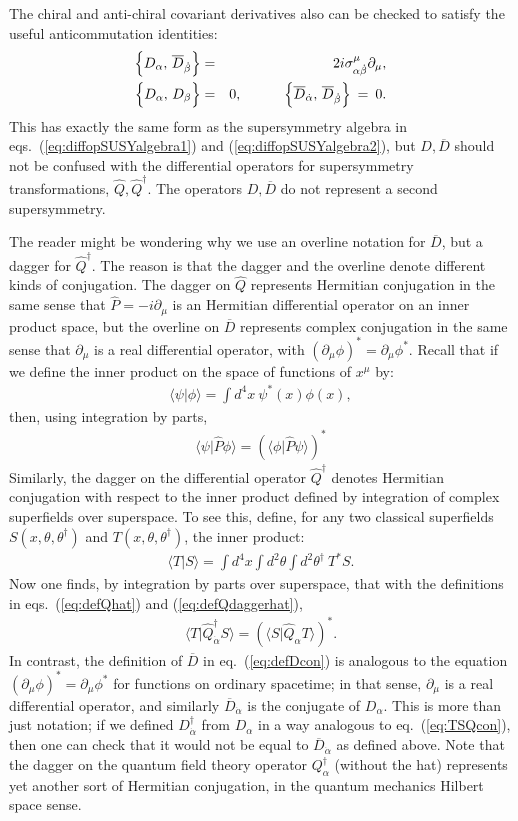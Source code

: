 \documentclass[11pt]{article}
\def\beq{\begin{eqnarray}}
\def\eeq{\end{eqnarray}}
\def\Dcon{\overline D}
\begin{document}
The chiral and anti-chiral covariant derivatives also can be checked to 
satisfy the useful 
anticommutation identities:
\beq
\Bigl \lbrace D_\alpha,\, \Dcon_{\dot\beta} \Bigr \rbrace  &=& 
2 i \sigma^\mu_{\alpha\dot\beta}\partial_\mu,
\label{eq:diffopderivs}
\\
\Bigl \lbrace D_\alpha,\, D_{\beta} \Bigr \rbrace &=& 0,\qquad\quad
\Bigl \lbrace \Dcon_{\dot \alpha},\,
              \Dcon_{\dot\beta} \Bigr \rbrace \>=\> 0.
\label{eq:diffopderivs2}
\eeq
This has exactly the same form as the supersymmetry algebra in 
eqs.~(\ref{eq:diffopSUSYalgebra1}) and (\ref{eq:diffopSUSYalgebra2}),
but $D, \Dcon$ should not be 
confused with 
the differential operators for supersymmetry transformations,
$\hat Q, \hat Q^\dagger$. The operators $D, \Dcon$ do not represent a second supersymmetry.

The reader might be wondering why we use an overline notation for $\Dcon$, but a dagger
for $\hat Q^\dagger$. The reason is that the dagger and the overline 
denote different kinds of conjugation. The dagger
on $\hat Q$ represents Hermitian conjugation in the same sense that 
$\hat P = -i \partial_\mu$ is an Hermitian differential operator on an 
inner product space, but the overline on $\Dcon$ represents 
complex conjugation in the same sense that
$\partial_\mu$ is a real differential operator, with 
$(\partial_\mu \phi)^* = \partial_\mu \phi^*$. Recall that if we 
define the inner product on the space of functions of $x^\mu$ by:
\beq
\langle \psi | \phi \rangle = \int \!d^4x\> \psi^*(x) \phi(x),
\eeq
then, using integration by parts,
\beq 
\langle \psi| \hat P \phi \rangle = \left (\langle \phi| \hat P \psi \rangle\right )^*
\eeq
Similarly, the dagger on the differential operator $\hat Q^\dagger$ denotes Hermitian
conjugation with respect to the inner product defined by integration of 
complex superfields over superspace. To see this, define, for any 
two classical superfields
$S(x,\theta,\theta^\dagger)$ and $T(x,\theta,\theta^\dagger)$, the inner product:
\beq
\langle T | S \rangle = \int d^4x\int\! d^2\theta\! \int\! d^2\theta^\dagger\> T^* S.
\eeq
Now one finds, by integration by parts over superspace, that with the definitions
in eqs.~(\ref{eq:defQhat}) and (\ref{eq:defQdaggerhat}),
\beq
\langle T | \hat Q^\dagger_{\dot\alpha} S \rangle = 
\left ( \langle S |\hat Q_\alpha T \rangle \right )^* .
\label{eq:TSQcon}
\eeq
In contrast, the definition of $\Dcon$ in eq.~(\ref{eq:defDcon}) is analogous
to the equation $(\partial_\mu \phi)^* = \partial_\mu \phi^*$ for functions 
on ordinary spacetime; in that sense, $\partial_\mu$ is a real differential operator,
and similarly $\Dcon_{\dot\alpha}$ is the conjugate of $D_\alpha$. 
This is more than just notation; if we
defined $D^\dagger_{\dot\alpha}$ from $D_\alpha$ in a way analogous to 
eq.~(\ref{eq:TSQcon}), then one can check that 
it would not be equal to $\Dcon_{\dot\alpha}$ as defined above. 
Note that the dagger on the quantum field theory operator $Q^\dagger_{\alpha}$ 
(without the hat) represents yet another sort of Hermitian conjugation, 
in the quantum mechanics Hilbert space sense. 
 
\end{document}
